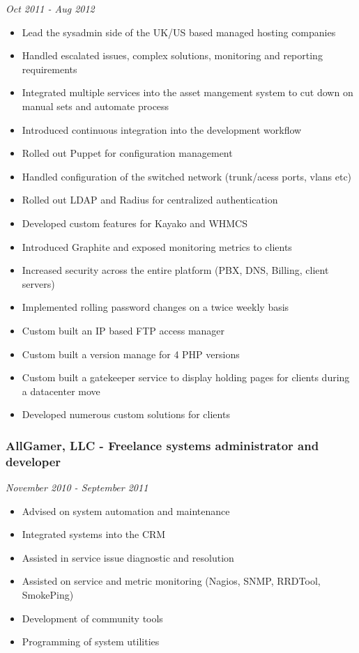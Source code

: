 \emph{Oct 2011 - Aug 2012}

\begin{itemize}
\item
  Lead the sysadmin side of the UK/US based managed hosting companies
\item
  Handled escalated issues, complex solutions, monitoring and reporting
  requirements
\item
  Integrated multiple services into the asset mangement system to cut
  down on manual sets and automate process
\item
  Introduced continuous integration into the development workflow
\item
  Rolled out Puppet for configuration management
\item
  Handled configuration of the switched network (trunk/acess ports,
  vlans etc)
\item
  Rolled out LDAP and Radius for centralized authentication
\item
  Developed custom features for Kayako and WHMCS
\item
  Introduced Graphite and exposed monitoring metrics to clients
\item
  Increased security across the entire platform (PBX, DNS, Billing,
  client servers)
\item
  Implemented rolling password changes on a twice weekly basis
\item
  Custom built an IP based FTP access manager
\item
  Custom built a version manage for 4 PHP versions
\item
  Custom built a gatekeeper service to display holding pages for clients
  during a datacenter move
\item
  Developed numerous custom solutions for clients
\end{itemize}

\subsubsection{AllGamer, LLC - Freelance systems administrator and
developer}

\emph{November 2010 - September 2011}

\begin{itemize}
\item
  Advised on system automation and maintenance
\item
  Integrated systems into the CRM
\item
  Assisted in service issue diagnostic and resolution
\item
  Assisted on service and metric monitoring (Nagios, SNMP, RRDTool,
  SmokePing)
\item
  Development of community tools
\item
  Programming of system utilities
\end{itemize}

